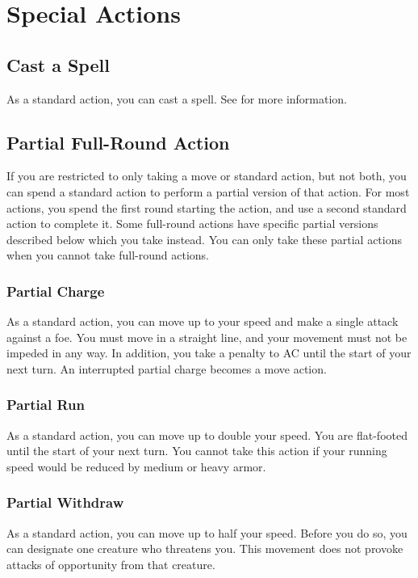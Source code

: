 \section{Special Actions}

\subsection{Cast a Spell}\label{Cast a Spell}
As a standard action, you can cast a spell. See  for more information. 

\subsection{Partial Full-Round Action}\label{Partial Full-Round Action}
If you are restricted to only taking a move or standard action, but not both, you can spend a standard action to perform a partial version of that action. For most actions, you spend the first round starting the action, and use a second standard action to complete it. Some full-round actions have specific partial versions described below which you take instead. You can only take these partial actions when you cannot take full-round actions. 

\subsubsection{Partial Charge}
As a standard action, you can move up to your speed and make a single attack against a foe. You must move in a straight line, and your movement must not be impeded in any way. In addition, you take a  penalty to AC until the start of your next turn. An interrupted partial charge becomes a move action.

\subsubsection{Partial Run}
As a standard action, you can move up to double your speed. You are flat-footed until the start of your next turn. You cannot take this action if your running speed would be reduced by medium or heavy armor. 

\subsubsection{Partial Withdraw}
As a standard action, you can move up to half your speed. Before you do so, you can designate one creature who threatens you. This movement does not provoke attacks of opportunity from that creature.

